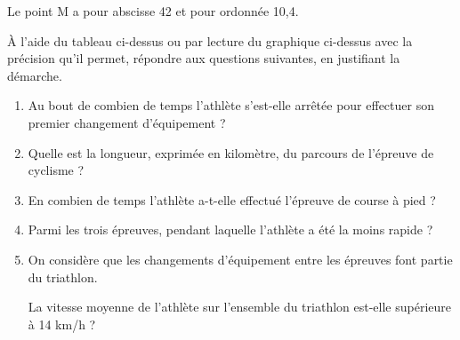 \documentclass[exercice,a4]{thedocument}%
\begin{document}
Le point M a pour abscisse 42 et pour ordonnée 10,4.

À l’aide du tableau ci-dessus ou par lecture du graphique ci-dessus avec la précision qu’il permet, répondre aux questions suivantes, en justifiant la démarche.

\medskip

	\begin{enumerate}
		\item Au bout de combien de temps l’athlète s’est-elle arrêtée pour effectuer son premier changement d'équipement ?
		\item Quelle est la longueur, exprimée en kilomètre, du parcours de l'épreuve de cyclisme ?
		\item En combien de temps l’athlète a-t-elle effectué l'épreuve de course à pied ?
		\item Parmi les trois épreuves, pendant laquelle l’athlète a été la moins rapide ?
		\item On considère que les changements d'équipement entre les épreuves font partie du triathlon.

La vitesse moyenne de l’athlète sur l’ensemble du triathlon est-elle supérieure à 14 km/h ?
	\end{enumerate}

\showthesource
\end{document}
